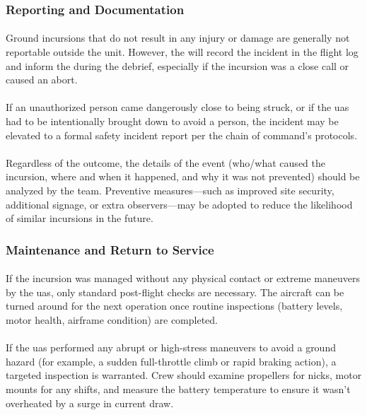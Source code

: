             \subsubsection{Reporting and Documentation}
                \paragraph{} Ground incursions that do not result in any injury or damage are generally not reportable outside the unit. However, the  will record the incident in the flight log and inform the  during the debrief, especially if the incursion was a close call or caused an abort.
                \paragraph{} If an unauthorized person came dangerously close to being struck, or if the \ac{uas} had to be intentionally brought down to avoid a person, the incident may be elevated to a formal safety incident report per the chain of command’s protocols.
                \paragraph{} Regardless of the outcome, the details of the event (who/what caused the incursion, where and when it happened, and why it was not prevented) should be analyzed by the team. Preventive measures—such as improved site security, additional signage, or extra observers—may be adopted to reduce the likelihood of similar incursions in the future.
            
            \subsubsection{Maintenance and Return to Service}
                \paragraph{} If the incursion was managed without any physical contact or extreme maneuvers by the \ac{uas}, only standard post-flight checks are necessary. The aircraft can be turned around for the next operation once routine inspections (battery levels, motor health, airframe condition) are completed.
                \paragraph{} If the \ac{uas} performed any abrupt or high-stress maneuvers to avoid a ground hazard (for example, a sudden full-throttle climb or rapid braking action), a targeted inspection is warranted. Crew should examine propellers for nicks, motor mounts for any shifts, and measure the battery temperature to ensure it wasn’t overheated by a surge in current draw.
